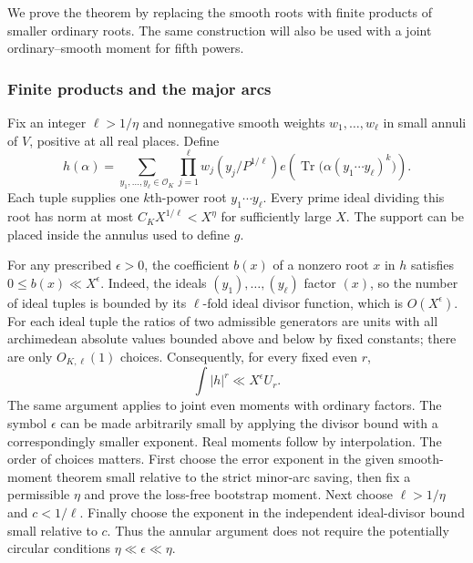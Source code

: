 \documentclass[11pt]{amsart}
\theoremstyle{definition}
\numberwithin{equation}{section}
\begin{document}
We prove the theorem by replacing the smooth roots with finite
products of smaller ordinary roots. The same construction will also
be used with a joint ordinary--smooth moment for fifth powers.

\subsubsection{Finite products and the major arcs}
Fix an integer $\ell>1/\eta$ and nonnegative smooth weights $w_1,\ldots,w_\ell$
in small annuli of $V$, positive at all real places.  Define
\[
 h(\alpha)=\sum_{y_1,\ldots,y_\ell\in\mathcal O_K}
 \prod_{j=1}^{\ell}w_j(y_j/P^{1/\ell})
 e\!\left(\operatorname {Tr}\bigl(\alpha(y_1\cdots y_\ell)^k\bigr)\right).
\]
Each tuple supplies one $k$th-power root $y_1\cdots y_\ell$.
Every prime ideal dividing this root has norm at most
$C_KX^{1/\ell}<X^\eta$ for sufficiently large $X$.
The support can be placed inside the annulus used to define $g$.

For any prescribed $\epsilon>0$, the coefficient $b(x)$ of a nonzero root $x$
in $h$ satisfies $0\le b(x)\ll X^\epsilon$.
Indeed, the ideals $(y_1),\ldots,(y_\ell)$ factor $(x)$, so the number of ideal
tuples is bounded by its $\ell$-fold ideal divisor function, which is $O(X^\epsilon)$.
For each ideal tuple the ratios of two admissible generators are units with
all archimedean absolute values bounded above and below by fixed constants;
there are only $O_{K,\ell}(1)$ choices.  Consequently, for every fixed even $r$,
\begin{equation}\label{eq:product-moment-domination}
 \int|h|^r\ll X^\epsilon U_r.
\end{equation}
The same argument applies to joint even moments with ordinary factors.
The symbol $\epsilon$ can be made arbitrarily small by applying the divisor bound
with a correspondingly smaller exponent.  Real moments follow by interpolation.
The order of choices matters.  First choose the error exponent in the given
smooth-moment theorem small relative to the strict minor-arc saving, then fix a
permissible $\eta$ and prove the loss-free bootstrap moment.  Next choose
$\ell>1/\eta$ and $c<1/\ell$.  Finally choose the exponent in the independent
ideal-divisor bound small relative to $c$.  Thus the annular argument does not
require the potentially circular conditions $\eta\ll\epsilon\ll\eta$.
\end{document}
